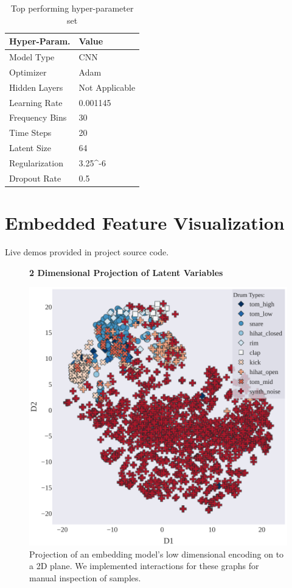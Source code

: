 \documentclass[runningheads,a4paper]{llncs}
\begin{document}
\begin{appendices}
\begin{table}[htbp!]
\centering
\begin{tabular}{|p{6cm}|p{6cm}|}
\hline
Hyper-Param. & Value  \\ \hline
Model Type      &  CNN  \\ \hline
Optimizer       & Adam  \\ \hline
Hidden Layers   & Not Applicable  \\\hline
Learning Rate   &  0.001145\\ \hline
Frequency Bins & 30 \\ \hline
Time Steps & 20 \\ \hline
Latent Size & 64 \\ \hline
Regularization & 3.25^{-6}\\ \hline
Dropout Rate & 0.5 \\ \hline
\end{tabular}
\caption{Top performing hyper-parameter set}
\label{table:best_params}
\end{table}


\chapter{Embedded Feature Visualization}
Live demos provided in project source code.
\label{appendix:tsne}
\begin{figure}[]
\centering
\textbf{2 Dimensional Projection of Latent Variables}\par\medskip
 \includegraphics[width=0.90\linewidth]{images/t-SNE_2d.pdf}
\caption{Projection of an embedding model's low dimensional encoding on to a 2D plane. We implemented interactions for these graphs for manual inspection of samples. }
\label{fig:2d_tsne}
\end{figure}


\end{appendices}
\end{document}
